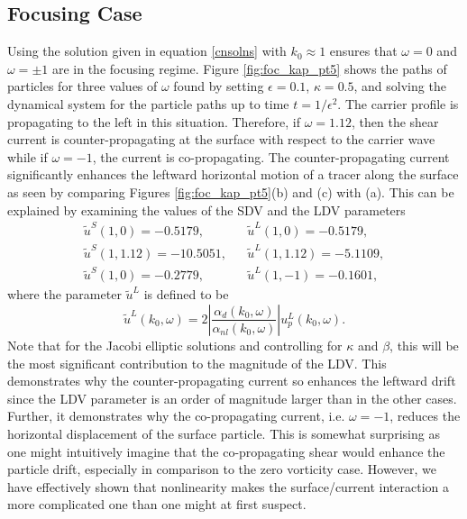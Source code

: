\documentclass{JFM_Style/jfm}
\begin{document}
\subsection{Focusing Case}

Using the solution given in equation \eqref{cnsolns} with $k_0\approx1$ ensures that $\omega = 0$ and $\omega=\pm 1$ are in the focusing regime.   Figure \ref{fig:foc_kap_pt5} shows the paths of particles for three values of $\omega$ found by setting $\epsilon=0.1$, $\kappa=0.5$, and solving the dynamical system for the particle paths up to time $t=1/\epsilon^{2}$.  The carrier profile is propagating to the left in this situation.  Therefore, if $\omega=1.12$, then the shear current is counter-propagating at the surface with respect to the carrier wave while if $\omega=-1$, the current is co-propagating.  The counter-propagating current significantly enhances the leftward horizontal motion of a tracer along the surface as seen by comparing Figures \ref{fig:foc_kap_pt5}(b) and (c) with (a).  This can be explained by examining the values of the SDV and the LDV parameters
\[
\begin{array}{lcl}
\tilde{u}^{S}(1,0) = -0.5179, & & \tilde{u}^{L}(1,0) = -0.5179,\\
\tilde{u}^{S}(1,1.12) = -10.5051,& & \tilde{u}^{L}(1,1.12) = -5.1109,\\
\tilde{u}^{S}(1,0) = -0.2779, & & \tilde{u}^{L}(1,-1) = -0.1601,
\end{array}
\]
where the parameter $\tilde{u}^{L}$ is defined to be 
\[
\tilde{u}^{L}(k_{0},\omega) = 2\left|\frac{\alpha_{d}(k_{0},\omega)}{\alpha_{nl}(k_{0},\omega)}\right|u^{L}_{p}(k_{0},\omega).
\]
Note that for the Jacobi elliptic solutions and controlling for $\kappa$ and $\beta$, this will be the most significant contribution to the magnitude of the LDV.  This demonstrates why the counter-propagating current so enhances the leftward drift since the LDV parameter is an order of magnitude larger than in the other cases.    Further, it demonstrates why the co-propagating current, i.e. $\omega=-1$, reduces the horizontal displacement of the surface particle.  This is somewhat surprising as one might intuitively imagine that the co-propagating shear would enhance the particle drift, especially in comparison to the zero vorticity case.  However, we have effectively shown that nonlinearity makes the surface/current interaction a more complicated one than one might at first suspect.  
\end{document}
